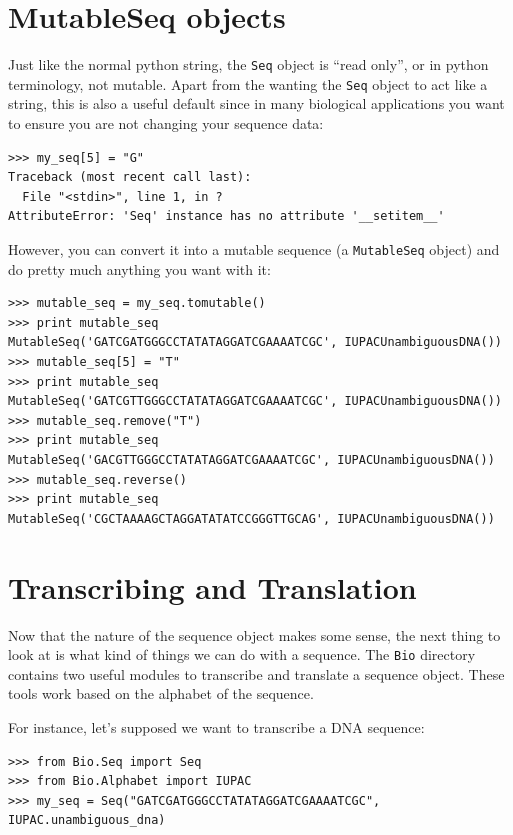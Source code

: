 \documentclass{report}
\begin{document}
\section{MutableSeq objects}

Just like the normal python string, the \verb|Seq| object is ``read only'', or in python terminology, not mutable.  Apart from the wanting the \verb|Seq| object to act like a string, this is also a useful default since in many biological applications you want to ensure you are not changing your sequence data:

\begin{verbatim}
>>> my_seq[5] = "G"
Traceback (most recent call last):
  File "<stdin>", line 1, in ?
AttributeError: 'Seq' instance has no attribute '__setitem__'
\end{verbatim}

However, you can convert it into a mutable sequence (a \verb|MutableSeq| object) and do pretty much anything you want with it:

\begin{verbatim}
>>> mutable_seq = my_seq.tomutable()
>>> print mutable_seq
MutableSeq('GATCGATGGGCCTATATAGGATCGAAAATCGC', IUPACUnambiguousDNA())
>>> mutable_seq[5] = "T"
>>> print mutable_seq
MutableSeq('GATCGTTGGGCCTATATAGGATCGAAAATCGC', IUPACUnambiguousDNA())
>>> mutable_seq.remove("T")
>>> print mutable_seq
MutableSeq('GACGTTGGGCCTATATAGGATCGAAAATCGC', IUPACUnambiguousDNA())
>>> mutable_seq.reverse()
>>> print mutable_seq
MutableSeq('CGCTAAAAGCTAGGATATATCCGGGTTGCAG', IUPACUnambiguousDNA())
\end{verbatim}

\section{Transcribing and Translation}

Now that the nature of the sequence object makes some sense, the next
thing to look at is what kind of things we can do with a sequence. The
\verb|Bio| directory contains two useful modules to transcribe and
translate a sequence object. These tools work based on the alphabet of
the sequence.

For instance, let's supposed we want to transcribe a DNA sequence:

\begin{verbatim}
>>> from Bio.Seq import Seq
>>> from Bio.Alphabet import IUPAC
>>> my_seq = Seq("GATCGATGGGCCTATATAGGATCGAAAATCGC", IUPAC.unambiguous_dna)
\end{verbatim}
\end{document}
